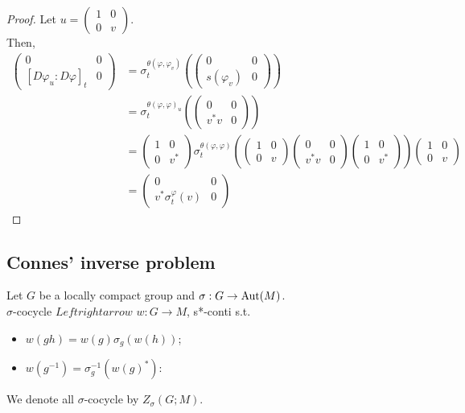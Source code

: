 \begin{proof}
  Let $u = \begin{pmatrix} 1 & 0 \\ 0 & v \end{pmatrix}$.\\
  Then,
  \begin{align*}
    \begin{pmatrix} 0 & 0 \\ [D\varphi_u:D\varphi]_t & 0 \end{pmatrix}
    &= \sigma_t^{\theta(\varphi,\varphi_v)}(\begin{pmatrix} 0 & 0 \\ s(\varphi_v) & 0 \end{pmatrix})\\
    &= \sigma_t^{\theta(\varphi,\varphi)_u}(\begin{pmatrix} 0 & 0 \\ v^*v & 0 \end{pmatrix})\\
    &= \begin{pmatrix} 1 & 0 \\ 0 & v^* \end{pmatrix} \sigma_t^{\theta(\varphi,\varphi)}(\begin{pmatrix} 1 & 0 \\ 0 & v \end{pmatrix}\begin{pmatrix} 0 & 0 \\ v^*v & 0 \end{pmatrix}\begin{pmatrix} 1 & 0 \\ 0 & v^* \end{pmatrix}) \begin{pmatrix} 1 & 0 \\ 0 & v \end{pmatrix}\\
    &= \begin{pmatrix} 0 & 0 \\ v^*\sigma_t^\varphi(v) & 0 \end{pmatrix}
  \end{align*}
\end{proof}

\subsection{Connes' inverse problem}

\begin{definition}
  Let $G$ be a locally compact group and $\sigma : G \rightarrow {\rm Aut} (M)$. \\
  $\sigma$-cocycle $Leftrightarrow$ $w : G \rightarrow M$, s*-conti s.t.
  \begin{itemize}
    \item $w(gh) = w(g)\sigma_g(w(h))$;
    \item $w(g^{-1}) = \sigma_g^{-1}(w(g)^*)$:
  \end{itemize}
  We denote all $\sigma$-cocycle by $Z_\sigma(G;M)$.
\end{definition}

